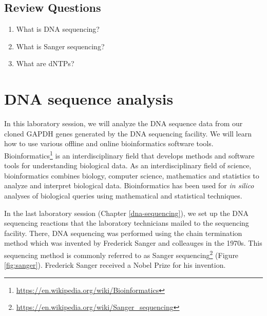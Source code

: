 \documentclass[]{book}
\providecommand{\tightlist}{%
  \setlength{\itemsep}{0pt}\setlength{\parskip}{0pt}}
\let\rmarkdownfootnote\footnote%
\def\footnote{\protect\rmarkdownfootnote}
\renewcommand{\href}[2]{#2\footnote{\url{#1}}}
\begin{document}
\section{Review Questions}\label{review-questions-8}

\begin{enumerate}
\def\labelenumi{\arabic{enumi}.}
\tightlist
\item
  What is DNA sequencing?
\item
  What is Sanger sequencing?
\item
  What are dNTPs?
\end{enumerate}

\chapter{DNA sequence analysis}\label{dna-sequence-analysis}

In this laboratory session, we will analyze the DNA sequence data from
our cloned GAPDH genes generated by the DNA sequencing facility. We will
learn how to use various offline and online bioinformatics software
tools.
\href{https://en.wikipedia.org/wiki/Bioinformatics}{Bioinformatics} is
an interdisciplinary field that develops methods and software tools for
understanding biological data. As an interdisciplinary field of science,
bioinformatics combines biology, computer science, mathematics and
statistics to analyze and interpret biological data. Bioinformatics has
been used for \emph{in silico} analyses of biological queries using
mathematical and statistical techniques.

In the last laboratory session (Chapter \ref{dna-sequencing}), we set up
the DNA sequencing reactions that the laboratory technicians mailed to
the sequencing facility. There, DNA sequencing was performed using the
chain termination method which was invented by Frederick Sanger and
colleauges in the 1970s. This sequencing method is commonly referred to
as \href{https://en.wikipedia.org/wiki/Sanger_sequencing}{Sanger
sequencing} (Figure \ref{fig:sanger}). Frederick Sanger received a Nobel
Prize for his invention.
\end{document}
